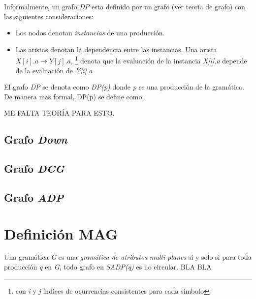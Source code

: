 Informalmente, un grafo \textit{DP} esta definido por un grafo (ver teoría de grafo) con las siguientes consideraciones: 

\begin{itemize}
\item Los nodos denotan \textit{instancias} de una producción.
\item Las aristas denotan la dependencia entre las instancias. Una arista $X[i].a\rightarrow Y[j].a$, \footnote{con \textit{i} y \textit{j} índices de ocurrencias consistentes para cada símbolo} denota que la evaluación de la instancia \textit{X[i].a} depende de la evaluación de \textit{Y[i].a} 
\end{itemize}

El grafo \textit{DP} se denota como \textit{DP(p)} donde \textit{p} es una producción de la gramática. De manera mas formal, DP(p) se define como:

ME FALTA TEORÍA PARA ESTO.


\subsection{Grafo \textit{Down}}

\subsection{Grafo \textit{DCG}}

\subsection{Grafo \textit{ADP}}



\section{Definición MAG}

Una gramática \textit{G} es una \textit{gramática de atributos multi-planes} si y solo si para toda producción \textit{q} en \textit{G}, todo grafo en \textit{SADP(q)} es no circular.
BLA BLA   
